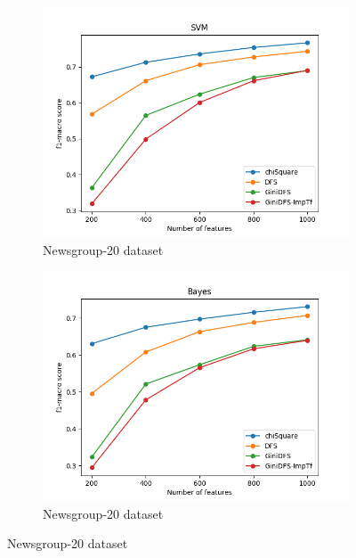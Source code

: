 \documentclass[a4paper, 14pt]{article}
\begin{document}
\begin{justify}
\begin{justify}
\begin{figure}[h!]
\centering
\begin{subfigure}{.5\textwidth}
  \centering
  \includegraphics[width=1.1\linewidth]{pf1_macro_ng_svm.png}
  \caption{Newsgroup-20 dataset}
  \label{fig:sub1}
\end{subfigure}%
\begin{subfigure}{.5\textwidth}
  \includegraphics[width=1.1\linewidth]{pf1_macro_ng_bayes.png}
  \caption{Newsgroup-20 dataset}
  \label{fig:sub2}
\end{subfigure}
\label{fig:test}
\end{figure}




\end{justify}
\end{justify}
\end{document}
